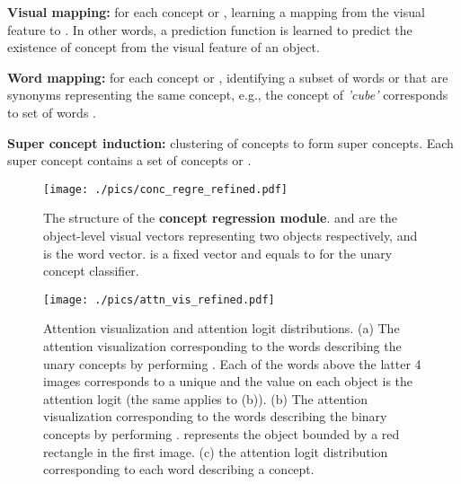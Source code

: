 \documentclass[final]{cvpr}
\begin{document}
\noindent \textbf{Visual mapping:} for each concept  or , learning a mapping from the visual feature  to . In other words, a prediction function  is learned to predict the existence of concept  from the visual feature  of an object.

\noindent \textbf{Word mapping:} for each concept  or , identifying a subset of words  or  that are synonyms representing the same concept, e.g., the concept of \emph{'cube'} corresponds to set of words .

\noindent \textbf{Super concept induction:} clustering of concepts to form super concepts. Each super concept  contains a set of concepts   or .





\begin{figure}
\centering
\texttt{[image: ./pics/conc\_regre\_refined.pdf]}
\caption{The structure of the \textbf{concept regression module}.  and  are the object-level visual vectors representing two objects respectively, and  is the word vector.  is a fixed vector and  equals to  for the unary concept classifier.}
\label{conc_regre}
\vspace{-3mm}
\end{figure}

\begin{figure*}
\centering
\texttt{[image: ./pics/attn\_vis\_refined.pdf]}
\caption{Attention visualization and attention logit distributions. (a) The attention visualization corresponding to the words describing the unary concepts by performing . Each of the words above the latter 4 images corresponds to a unique  and the value on each object is the attention logit (the same applies to (b)). (b) The attention visualization corresponding to the words describing the binary concepts by performing .  represents the object bounded by a red rectangle in the first image. (c) the attention logit distribution corresponding to each word describing a concept. }
\label{attn_vis}
\vspace{-3mm}
\end{figure*}
\end{document}
